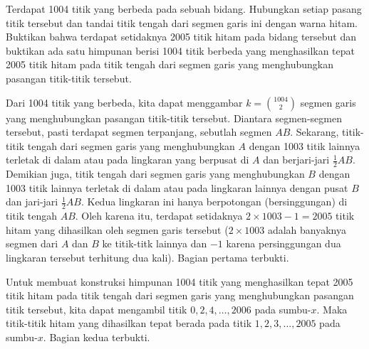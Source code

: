 \documentclass[12pt]{scrartcl}
\begin{document}
\begin{soaljawab}
    Terdapat 1004 titik yang berbeda pada sebuah bidang. Hubungkan setiap pasang titik tersebut dan tandai titik tengah dari segmen garis ini dengan warna hitam. Buktikan bahwa terdapat setidaknya 2005 titik hitam pada bidang tersebut dan buktikan ada satu himpunan berisi 1004 titik berbeda yang menghasilkan tepat 2005 titik hitam pada titik tengah dari segmen garis yang menghubungkan pasangan titik-titik tersebut.
    \begin{solusi}
        Dari 1004 titik yang berbeda, kita dapat menggambar $k = {1004 \choose 2}$ segmen garis yang menghubungkan pasangan titik-titik tersebut. Diantara segmen-segmen tersebut, pasti terdapat segmen terpanjang, sebutlah segmen $AB$. Sekarang, titik-titik tengah dari segmen garis yang menghubungkan $A$ dengan 1003 titik lainnya terletak di dalam atau pada lingkaran yang berpusat di $A$ dan berjari-jari $\frac12 AB$. Demikian juga, titik tengah dari segmen garis yang menghubungkan $B$ dengan 1003 titik lainnya terletak di dalam atau pada lingkaran lainnya dengan pusat $B$ dan jari-jari $\frac12 AB$. Kedua lingkaran ini hanya berpotongan (bersinggungan) di titik tengah $AB$. Oleh karena itu, terdapat setidaknya $2 \times 1003 - 1 = 2005$  titik hitam yang dihasilkan oleh segmen garis tersebut ($2 \times 1003$ adalah banyaknya segmen dari $A$ dan $B$ ke titik-titk lainnya dan $-1$ karena persinggungan dua lingkaran tersebut terhitung dua kali). Bagian pertama terbukti.
        
        Untuk membuat konstruksi himpunan 1004 titik yang menghasilkan tepat 2005 titik hitam pada titik tengah dari segmen garis yang menghubungkan pasangan titik tersebut, kita dapat mengambil titik $0, 2, 4, \dots, 2006$ pada sumbu-$x$. Maka titik-titik hitam yang dihasilkan tepat berada pada titik $1, 2, 3, ..., 2005$ pada sumbu-$x$. Bagian kedua terbukti.
    \end{solusi}
\end{soaljawab}
\end{document}
